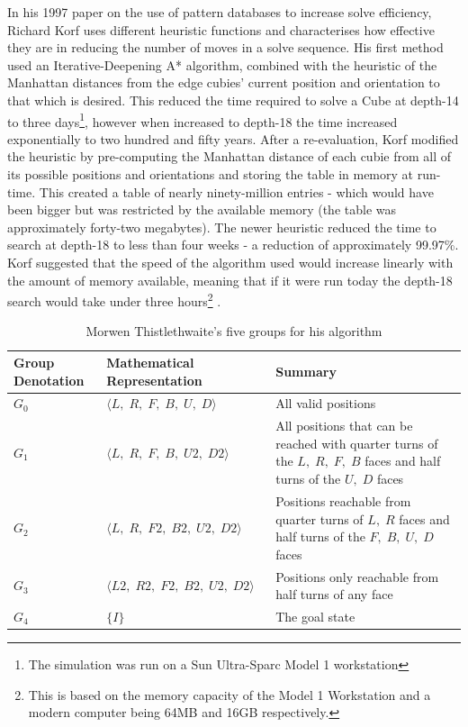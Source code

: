 \documentclass{report}
\begin{document}
    In his 1997 paper on the use of pattern databases to increase solve efficiency, Richard Korf uses different heuristic functions and characterises how effective they are in reducing the number of moves in a solve sequence. His first method used an Iterative-Deepening A* algorithm, combined with the heuristic of the Manhattan distances from the edge cubies' current position and orientation to that which is desired. This reduced the time required to solve a Cube at depth-14 to three days\footnote{The simulation was run on a Sun Ultra-Sparc Model 1 workstation}, however when increased to depth-18 the time increased exponentially to two hundred and fifty years. After a re-evaluation, Korf modified the heuristic by pre-computing the Manhattan distance of each cubie from all of its possible positions and orientations and storing the table in memory at run-time. This created a table of nearly ninety-million entries - which would have been bigger but was restricted by the available memory (the table was approximately forty-two megabytes). The newer heuristic reduced the time to search at depth-18 to less than four weeks - a reduction of approximately 99.97\%. Korf suggested that the speed of the algorithm used would increase linearly with the amount of memory available, meaning that if it were run today the depth-18 search would take under three hours\footnote{This is based on the memory capacity of the Model 1 Workstation and a modern computer being 64MB and 16GB respectively.} \cite{Korf1997}.
    
   	\begin{table}[htbp]
    	\def\arraystretch{1.25}
    	\centering
    	\caption{Morwen Thistlethwaite's five groups for his algorithm \cite{Singmaster1981}}
    	\label{tab:thistlethwaite}
    	\begin{tabular}{M{0.15\textwidth}M{0.3\textwidth}m{0.525\textwidth}}
    		\toprule
    		\textbf{Group Denotation} & \textbf{Mathematical Representation} & \textbf{Summary} \\
    		\midrule
   			$G_0$	&	$\langle L,\;R,\;F,\;B,\;U,\;D \rangle$	&	All valid positions \\    		
	    	$G_1$	&	$\langle L,\;R,\;F,\;B,\;U2,\;D2 \rangle$	&	All positions that can be reached with quarter turns of the $L,\;R,\;F,\;B$ faces and half turns of the $U,\;D$ faces \\
	    	$G_2$	&	$\langle L,\;R,\;F2,\;B2,\;U2,\;D2 \rangle$	&	Positions reachable from quarter turns of $L,\;R$ faces and half turns of the $F,\;B,\;U,\;D$ faces \\
	    	$G_3$	&	$\langle L2,\;R2,\;F2,\;B2,\;U2,\;D2 \rangle$	&	Positions only reachable from half turns of any face \\
	    	$G_4$	&	$ \{I\}$	&	The goal state \\
    		\bottomrule
    	\end{tabular}
    \end{table}
    
\end{document}
